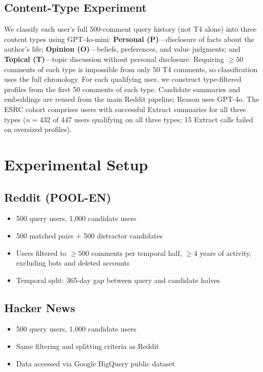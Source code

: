 \documentclass[sigplan,screen,nonacm]{acmart}
\begin{document}
\subsection{Content-Type Experiment}
We classify each user's full 500-comment query history (not T4 alone) into three
content types using GPT-4o-mini: \textbf{Personal (P)}---disclosure of facts about
the author's life; \textbf{Opinion (O)}---beliefs, preferences, and value
judgments; and \textbf{Topical (T)}---topic discussion without personal disclosure.
Requiring $\geq 50$ comments of each type is impossible from only 50 T4 comments, so
classification uses the full chronology. For each qualifying user, we construct
type-filtered profiles from the first 50 comments of each type. Candidate summaries
and embeddings are reused from the main Reddit pipeline; Reason uses GPT-4o. The ESRC
cohort comprises users with successful Extract summaries for all three types
($n = 432$ of 447 users qualifying on all three types; 15 Extract calls failed on
oversized profiles).


\section{Experimental Setup}


\subsection{Reddit (POOL-EN)}
\begin{itemize}
  \item 500 query users, 1{,}000 candidate users
  \item 500 matched pairs + 500 distractor candidates
  \item Users filtered to $\geq 500$ comments per temporal half, $\geq 4$ years
        of activity, excluding bots and deleted accounts
  \item Temporal split: 365-day gap between query and candidate halves
\end{itemize}

\subsection{Hacker News}
\begin{itemize}
  \item 500 query users, 1{,}000 candidate users
  \item Same filtering and splitting criteria as Reddit
  \item Data accessed via Google BigQuery public dataset
\end{itemize}
\end{document}

